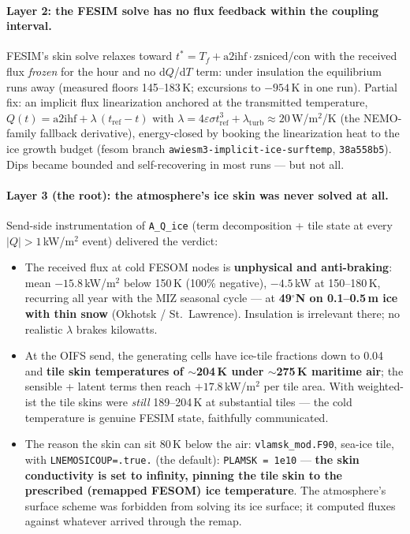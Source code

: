 \documentclass[11pt,a4paper]{article}
\newcommand{\code}[1]{\texttt{\small #1}}
\begin{document}
\paragraph{Layer 2: the FESIM solve has no flux feedback within the coupling interval.}
FESIM's skin solve relaxes toward $t^{*}=T_f+\mathrm{a2ihf}\cdot\mathrm{zsniced}/\mathrm{con}$ with
the received flux \emph{frozen} for the hour and no d$Q$/d$T$ term: under insulation the equilibrium
runs away (measured floors 145--183\,K; excursions to $-954$\,K in one run). Partial fix: an
implicit flux linearization anchored at the transmitted temperature,
$Q(t)=\mathrm{a2ihf}+\lambda\,(t_{\mathrm{ref}}-t)$ with
$\lambda = 4\varepsilon\sigma t_{\mathrm{ref}}^3 + \lambda_{\mathrm{turb}} \approx 20$\,W/m$^2$/K
(the NEMO-family fallback derivative), energy-closed by booking the linearization heat to the ice
growth budget (fesom branch \code{awiesm3-implicit-ice-surftemp}, \code{38a558b5}). Dips became
bounded and self-recovering in most runs --- but not all.

\paragraph{Layer 3 (the root): the atmosphere's ice skin was never solved at all.}
Send-side instrumentation of \code{A\_Q\_ice} (term decomposition + tile state at every
$|Q|>1$\,kW/m$^2$ event) delivered the verdict:

\begin{itemize}
\item The received flux at cold FESOM nodes is \textbf{unphysical and anti-braking}: mean
  $-15.8$\,kW/m$^2$ below 150\,K (100\% negative), $-4.5$\,kW at 150--180\,K, recurring all year
  with the MIZ seasonal cycle --- at \textbf{49$^\circ$N on 0.1--0.5\,m ice with thin snow}
  (Okhotsk / St.\ Lawrence). Insulation is irrelevant there; no realistic $\lambda$ brakes kilowatts.
\item At the OIFS send, the generating cells have ice-tile fractions down to 0.04 and
  \textbf{tile skin temperatures of $\sim$204\,K under $\sim$275\,K maritime air}; the sensible +
  latent terms then reach $+17.8$\,kW/m$^2$ per tile area. With weighted-ist the tile skins were
  \emph{still} 189--204\,K at substantial tiles --- the cold temperature is genuine FESIM state,
  faithfully communicated.
\item The reason the skin can sit 80\,K below the air: \code{vlamsk\_mod.F90}, sea-ice tile, with
  \code{LNEMOSICOUP=.true.} (the default): \code{PLAMSK = 1e10} --- \textbf{the skin conductivity is
  set to infinity, pinning the tile skin to the prescribed (remapped FESOM) ice temperature}. The
  atmosphere's surface scheme was forbidden from solving its ice surface; it computed fluxes against
  whatever arrived through the remap.
\end{itemize}
\end{document}
